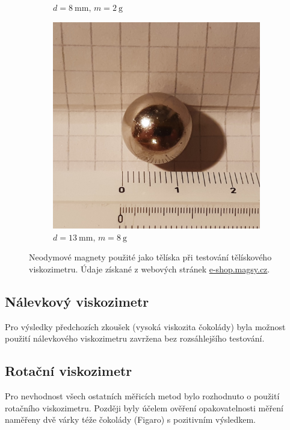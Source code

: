 \documentclass[12pt]{article}
\begin{document}
\begin{figure}
\begin{subfigure}[b]{.3\textwidth}
        \caption{$d = \SI{8}{\milli\metre}\text{, }m = \SI{2}{\gram}$}
    \end{subfigure}
    \hfill
    \begin{subfigure}[b]{.3\textwidth}
        \includegraphics[width = \textwidth]{figures/koule13.jpg}
        \caption{$d = \SI{13}{\milli\metre}\text{, }m = \SI{8}{\gram}$}
    \end{subfigure}
    \caption{Neodymové magnety použité jako tělíska při testování tělískového viskozimetru. Údaje získané z webových stránek \url{e-shop.magsy.cz}.}
    \label{fig:koule}
\end{figure}

\subsection{Nálevkový viskozimetr}
Pro výsledky předchozích zkoušek (vysoká viskozita čokolády) byla možnost použití nálevkového viskozimetru zavržena bez rozsáhlejšího testování.

\subsection{Rotační viskozimetr}
Pro nevhodnost všech ostatních měřicích metod bylo rozhodnuto o použití rotačního viskozimetru. Později byly účelem ověření opakovatelnosti měření naměřeny dvě várky téže čokolády (Figaro) s pozitivním výsledkem.
\end{document}
